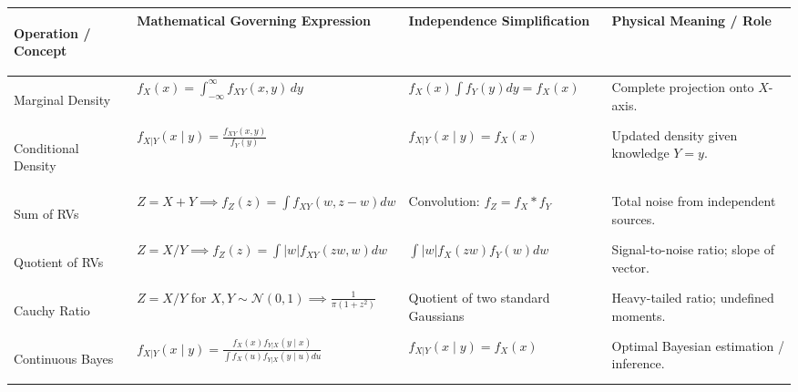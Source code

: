 \documentclass[12pt,a4paper]{article}
\renewcommand{\arraystretch}{1.45}
\begin{document}
\vspace{2pt}

\begin{tcolorbox}[tikzbox, title={\textbf{Summary Matrix: Comprehensive Comparison of Bivariate Operations}}]
\par\vspace{1pt}
\begingroup
\setlength{\tabcolsep}{3.5pt}
\setlength{\extrarowheight}{1.0pt}
\renewcommand{\arraystretch}{1.15}
\noindent\begin{tabularx}{\linewidth}{|>{\small\bfseries\raggedright\arraybackslash}m{2.3cm}|>{\small\raggedright\arraybackslash}m{4.6cm}|>{\small\raggedright\arraybackslash}m{3.9cm}|Y|}
\hline
\textbf{Operation / Concept} & \textbf{Mathematical Governing Expression} & \textbf{Independence Simplification} & \textbf{Physical Meaning / Role} \\
\hline
Marginal Density & $f_X(x) = \int_{-\infty}^\infty f_{XY}(x, y) \, dy$ & $f_X(x) \int f_Y(y) dy = f_X(x)$ & Complete projection onto $X$-axis. \\
\hline
Conditional Density & $f_{X|Y}(x \mid y) = \frac{f_{XY}(x, y)}{f_Y(y)}$ & $f_{X|Y}(x \mid y) = f_X(x)$ & Updated density given knowledge $Y=y$. \\
\hline
Sum of RVs & $Z = X + Y \implies f_Z(z) = \int f_{XY}(w, z-w) dw$ & Convolution: $f_Z = f_X * f_Y$ & Total noise from independent sources. \\
\hline
Quotient of RVs & $Z = X / Y \implies f_Z(z) = \int |w| f_{XY}(zw, w) dw$ & $\int |w| f_X(zw) f_Y(w) dw$ & Signal-to-noise ratio; slope of vector. \\
\hline
Cauchy Ratio & $Z = X/Y$ for $X,Y \sim \mathcal{N}(0, 1) \implies \frac{1}{\pi(1+z^2)}$ & Quotient of two standard Gaussians & Heavy-tailed ratio; undefined moments. \\
\hline
Continuous Bayes & $f_{X|Y}(x \mid y) = \frac{f_X(x) f_{Y|X}(y \mid x)}{\int f_X(u) f_{Y|X}(y \mid u) du}$ & $f_{X|Y}(x \mid y) = f_X(x)$ & Optimal Bayesian estimation / inference. \\
\hline
\end{tabularx}\par
\endgroup
\end{tcolorbox}
\end{document}
